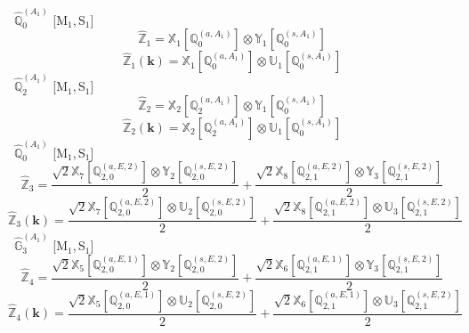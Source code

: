 \documentclass[fleqn,10pt,landscape]{article}
\begin{document}
\begin{itemize}
\vspace{4mm}
\noindent {} $\,\,\,\hat{\mathbb{Q}}_{0}^{(A_{1})}$ [M$_{1}$,\,S$_{1}$]
\begin{dmath*}
\hat{\mathbb{Z}}_{1}=\mathbb{X}_{1}[\mathbb{Q}_{0}^{(a,A_{1})}] \otimes\mathbb{Y}_{1}[\mathbb{Q}_{0}^{(s,A_{1})}]
\end{dmath*}
\begin{dmath*}
\hat{\mathbb{Z}}_{1}(\bm{k})=\mathbb{X}_{1}[\mathbb{Q}_{0}^{(a,A_{1})}] \otimes\mathbb{U}_{1}[\mathbb{Q}_{0}^{(s,A_{1})}]
\end{dmath*}
\vspace{4mm}
\noindent {} $\,\,\,\hat{\mathbb{Q}}_{2}^{(A_{1})}$ [M$_{1}$,\,S$_{1}$]
\begin{dmath*}
\hat{\mathbb{Z}}_{2}=\mathbb{X}_{2}[\mathbb{Q}_{2}^{(a,A_{1})}] \otimes\mathbb{Y}_{1}[\mathbb{Q}_{0}^{(s,A_{1})}]
\end{dmath*}
\begin{dmath*}
\hat{\mathbb{Z}}_{2}(\bm{k})=\mathbb{X}_{2}[\mathbb{Q}_{2}^{(a,A_{1})}] \otimes\mathbb{U}_{1}[\mathbb{Q}_{0}^{(s,A_{1})}]
\end{dmath*}
\vspace{4mm}
\noindent {} $\,\,\,\hat{\mathbb{Q}}_{0}^{(A_{1})}$ [M$_{1}$,\,S$_{1}$]
\begin{dmath*}
\hat{\mathbb{Z}}_{3}=\frac{\sqrt{2} \mathbb{X}_{7}[\mathbb{Q}_{2,0}^{(a,E,2)}] \otimes\mathbb{Y}_{2}[\mathbb{Q}_{2,0}^{(s,E,2)}]}{2} + \frac{\sqrt{2} \mathbb{X}_{8}[\mathbb{Q}_{2,1}^{(a,E,2)}] \otimes\mathbb{Y}_{3}[\mathbb{Q}_{2,1}^{(s,E,2)}]}{2}
\end{dmath*}
\begin{dmath*}
\hat{\mathbb{Z}}_{3}(\bm{k})=\frac{\sqrt{2} \mathbb{X}_{7}[\mathbb{Q}_{2,0}^{(a,E,2)}] \otimes\mathbb{U}_{2}[\mathbb{Q}_{2,0}^{(s,E,2)}]}{2} + \frac{\sqrt{2} \mathbb{X}_{8}[\mathbb{Q}_{2,1}^{(a,E,2)}] \otimes\mathbb{U}_{3}[\mathbb{Q}_{2,1}^{(s,E,2)}]}{2}
\end{dmath*}
\vspace{4mm}
\noindent {} $\,\,\,\hat{\mathbb{G}}_{3}^{(A_{1})}$ [M$_{1}$,\,S$_{1}$]
\begin{dmath*}
\hat{\mathbb{Z}}_{4}=\frac{\sqrt{2} \mathbb{X}_{5}[\mathbb{Q}_{2,0}^{(a,E,1)}] \otimes\mathbb{Y}_{2}[\mathbb{Q}_{2,0}^{(s,E,2)}]}{2} + \frac{\sqrt{2} \mathbb{X}_{6}[\mathbb{Q}_{2,1}^{(a,E,1)}] \otimes\mathbb{Y}_{3}[\mathbb{Q}_{2,1}^{(s,E,2)}]}{2}
\end{dmath*}
\begin{dmath*}
\hat{\mathbb{Z}}_{4}(\bm{k})=\frac{\sqrt{2} \mathbb{X}_{5}[\mathbb{Q}_{2,0}^{(a,E,1)}] \otimes\mathbb{U}_{2}[\mathbb{Q}_{2,0}^{(s,E,2)}]}{2} + \frac{\sqrt{2} \mathbb{X}_{6}[\mathbb{Q}_{2,1}^{(a,E,1)}] \otimes\mathbb{U}_{3}[\mathbb{Q}_{2,1}^{(s,E,2)}]}{2}

\end{dmath*}
\end{itemize}
\end{document}
